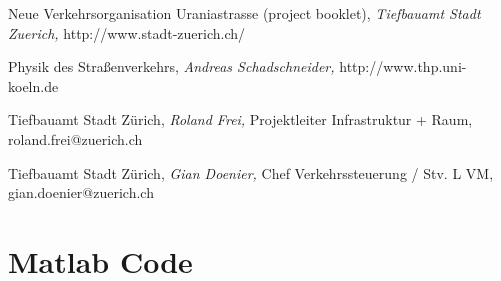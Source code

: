 \documentclass[11pt]{article}
\begin{document}
\newpage
\begin{thebibliography}{9}

 Neue Verkehrsorganisation Uraniastrasse (project booklet),
 \emph{Tiefbauamt Stadt Zuerich,}
http://www.stadt-zuerich.ch/
  
 Physik des Straßenverkehrs,
 \emph{Andreas Schadschneider,}
 http://www.thp.uni-koeln.de
 
 Tiefbauamt Stadt Zürich,
 \emph{Roland Frei,}
 Projektleiter Infrastruktur + Raum, roland.frei@zuerich.ch
  
 Tiefbauamt Stadt Zürich,
 \emph{Gian Doenier,}
 Chef Verkehrssteuerung / Stv. L VM, gian.doenier@zuerich.ch
 
\end{thebibliography}

\newpage
{}


\section*{Matlab Code}
















\end{document}
